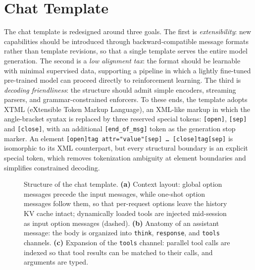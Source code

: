 \section{Chat Template}
\label{sec:post-chat-template}

The  chat template is redesigned around three goals. The first is \emph{extensibility}: new capabilities should be introduced through backward-compatible message formats rather than template revisions, so that a single template serves the entire model generation. The second is a \emph{low alignment tax}: the format should be learnable with minimal supervised data, supporting a pipeline in which a lightly fine-tuned pre-trained model can proceed directly to reinforcement learning. The third is \emph{decoding friendliness}: the structure should admit simple encoders, streaming parsers, and grammar-constrained enforcers. To these ends, the template adopts XTML (eXtensible Token Markup Language), an XML-like markup in which the angle-bracket syntax is replaced by three reserved special tokens: \texttt{[open]}, \texttt{[sep]} and \texttt{[close]}, with an additional \texttt{[end\_of\_msg]} token as the generation stop marker. An element \texttt{[open]tag attr="value"[sep] \dots\ [close]tag[sep]} is isomorphic to its XML counterpart, but every structural boundary is an explicit special token, which removes tokenization ambiguity at element boundaries and simplifies constrained decoding.

\begin{figure}[t]
    \centering
    
    \caption{Structure of the  chat template.
        \textbf{(a)} Context layout: global option messages precede the input messages, while one-shot option messages follow them, so that per-request options leave the history KV cache intact; dynamically loaded tools are injected mid-session as input option messages (dashed).
        \textbf{(b)} Anatomy of an assistant message: the body is organized into \texttt{think}, \texttt{response}, and \texttt{tools} channels.
        \textbf{(c)} Expansion of the \texttt{tools} channel: parallel tool calls are indexed so that tool results can be matched to their calls, and arguments are typed.}
    \label{fig:chat-template}
\end{figure}

